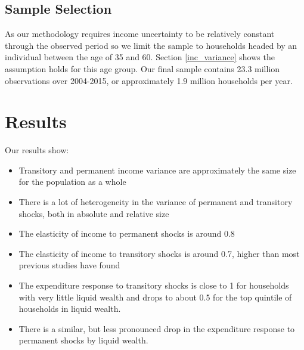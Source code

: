 \documentclass[titlepage]{\econtex}\newcommand{\texname}{IncomeUncertainty}
\begin{document}
\subsection{Sample Selection}
As our methodology requires income uncertainty to be relatively constant through the observed period so we limit the sample to households headed by an individual between the age of 35 and 60. Section \ref{inc_variance} shows the assumption holds for this age group. Our final sample contains 23.3 million observations over 2004-2015, or approximately 1.9 million households per year.

\section{Results}
Our results show:
\begin{itemize}
	\item Transitory and permanent income variance are approximately the same size for the population as a whole
	\item There is a lot of heterogeneity in the variance of permanent and transitory shocks, both in absolute and relative size
	\item The elasticity of income to permanent shocks is around 0.8
	\item The elasticity of income to transitory shocks is around 0.7, higher than most previous studies have found
	\item The expenditure response to transitory shocks is close to 1 for households with very little liquid wealth and drops to about 0.5 for the top quintile of households in liquid wealth.
	\item There is a similar, but less pronounced drop in the expenditure response to permanent shocks by liquid wealth.
\end{itemize}
\end{document}
